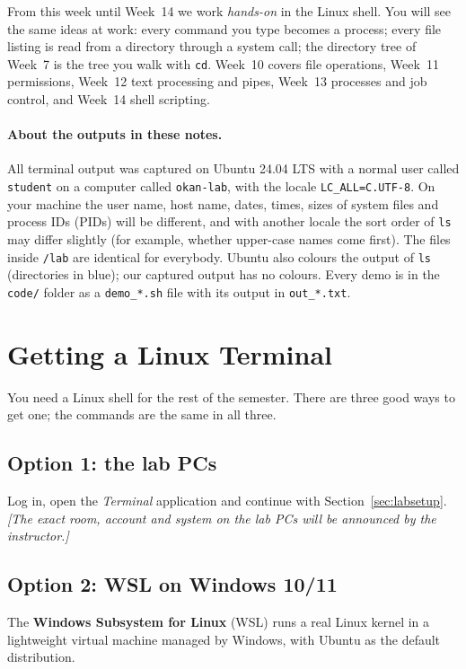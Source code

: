\documentclass[11pt,a4paper]{article}
\newcommand{\term}[1]{\textbf{\color{mintdeep}#1}}
\newcommand{\cmd}[1]{\texttt{#1}}
\begin{document}
From this week until Week~14 we work \emph{hands-on} in the Linux shell. You will see the same ideas at work: every command you type becomes a process; every file listing is read from a directory through a system call; the directory tree of Week~7 is the tree you walk with \cmd{cd}. Week~10 covers file operations, Week~11 permissions, Week~12 text processing and pipes, Week~13 processes and job control, and Week~14 shell scripting.
\paragraph{About the outputs in these notes.} All terminal output was captured on Ubuntu 24.04 LTS with a normal user called \texttt{student} on a computer called \texttt{okan-lab}, with the locale \texttt{LC\_ALL=C.UTF-8}. On your machine the user name, host name, dates, times, sizes of system files and process IDs (PIDs) will be different, and with another locale the sort order of \cmd{ls} may differ slightly (for example, whether upper-case names come first). The files inside \texttt{\tl/lab} are identical for everybody. Ubuntu also colours the output of \cmd{ls} (directories in blue); our captured output has no colours. Every demo is in the \texttt{code/} folder as a \texttt{demo\_*.sh} file with its output in \texttt{out\_*.txt}.

\section{Getting a Linux Terminal}
\label{sec:getlinux}

You need a Linux shell for the rest of the semester. There are three good ways to get one; the commands are the same in all three.


\subsection{Option 1: the lab PCs}
Log in, open the \emph{Terminal} application and continue with Section~\ref{sec:labsetup}. \emph{[The exact room, account and system on the lab PCs will be announced by the instructor.]}

\subsection{Option 2: WSL on Windows 10/11}
The \term{Windows Subsystem for Linux} (WSL) runs a real Linux kernel in a lightweight virtual machine managed by Windows, with Ubuntu as the default distribution.
\end{document}
